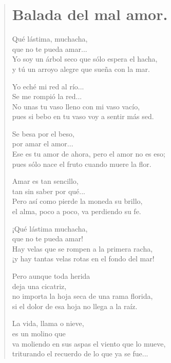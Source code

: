 \documentclass[11pt, portrait, twoside, notitlepage, openright]{book}
\begin{document}
\newpage
\begin{verse}
\begin{center}
\section{Balada del mal amor.}
\end{center}
Qué lástima, muchacha,\\
que no te pueda amar...\\
Yo soy un árbol seco que sólo espera el hacha,\\
y tú un arroyo alegre que sueña con la mar.
\newline

Yo eché mi red al río...\\
Se me rompió la red...\\
No unas tu vaso lleno con mi vaso vacío,\\
pues si bebo en tu vaso voy a sentir más sed.
\newline

Se besa por el beso,\\
por amar el amor...\\
Ese es tu amor de ahora, pero el amor no es eso;\\
pues sólo nace el fruto cuando muere la flor.
\newline

Amar es tan sencillo,\\
tan sin saber por qué...\\
Pero así como pierde la moneda su brillo,\\
el alma, poco a poco, va perdiendo su fe.
\newline

¡Qué lástima muchacha,\\
que no te pueda amar!\\
Hay velas que se rompen a la primera racha,\\
¡y hay tantas velas rotas en el fondo del mar!
\newline

Pero aunque toda herida\\
deja una cicatriz,\\
no importa la hoja seca de una rama florida,\\
si el dolor de esa hoja no llega a la raíz.
\newline

La vida, llama o nieve,\\
es un molino que\\
va moliendo en sus aspas el viento que lo mueve,\\
triturando el recuerdo de lo que ya se fue...
\newline


\end{verse}
\end{document}
